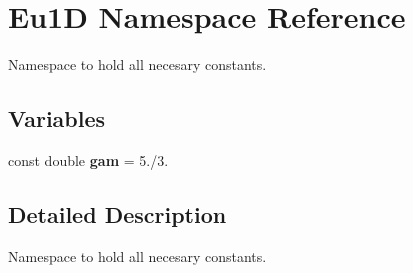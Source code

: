 \hypertarget{namespaceEu1D}{}\section{Eu1D Namespace Reference}
\label{namespaceEu1D}


Namespace to hold all necesary constants.  


\subsection*{Variables}
\begin{DoxyCompactItemize}
\item 
\mbox{\label{namespaceEu1D_a11c0e40fc3c8e0bfa0fdddf6ff676661}} 
const double {\bfseries gam} = 5./3.
\end{DoxyCompactItemize}


\subsection{Detailed Description}
Namespace to hold all necesary constants. 